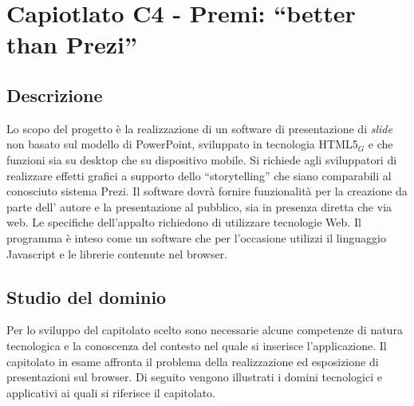 \section{Capiotlato C4 - Premi: ``better than Prezi''}
\subsection{Descrizione}
Lo scopo del progetto è la realizzazione di un software di presentazione di \textit{slide} non basato sul modello di PowerPoint, sviluppato in tecnologia HTML5$_{G}$ e che funzioni sia su desktop che su dispositivo mobile. Si richiede agli sviluppatori di realizzare effetti grafici a supporto dello ``storytelling'' che siano comparabili al conosciuto sistema Prezi. Il software dovrà fornire funzionalità per la creazione da parte dell' autore e la presentazione al pubblico, sia in presenza diretta che via web. Le specifiche dell'appalto richiedono di utilizzare tecnologie Web. Il programma è inteso come un software che per l'occasione utilizzi il linguaggio Javascript e le librerie contenute nel browser.

\subsection{Studio del dominio}
Per lo sviluppo del capitolato scelto sono necessarie alcune competenze di natura tecnologica e la conoscenza del contesto nel quale si inserisce l’applicazione. Il capitolato in esame affronta il problema della realizzazione ed esposizione di presentazioni sul browser. Di seguito vengono illustrati i domini tecnologici e applicativi ai quali si riferisce il capitolato.

